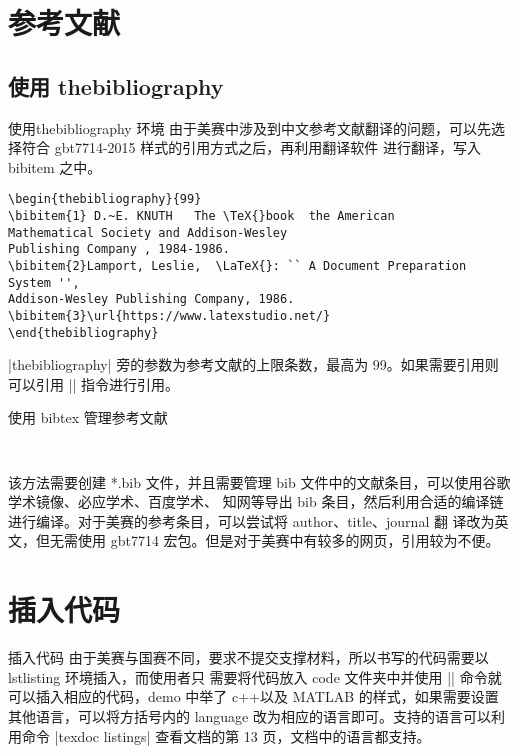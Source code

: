 \section{参考文献}
\subsection{使用 thebibliography }

\begin{frame}[fragile]{使用thebibliography 环境}
由于美赛中涉及到中文参考文献翻译的问题，可以先选择符合 gbt7714-2015 样式的引用方式之后，再利用翻译软件
进行翻译，写入 bibitem 之中。
\begin{lstlisting}[basicstyle=\tiny]
\begin{thebibliography}{99}
\bibitem{1} D.~E. KNUTH   The \TeX{}book  the American
Mathematical Society and Addison-Wesley
Publishing Company , 1984-1986.
\bibitem{2}Lamport, Leslie,  \LaTeX{}: `` A Document Preparation System '',
Addison-Wesley Publishing Company, 1986.
\bibitem{3}\url{https://www.latexstudio.net/}
\end{thebibliography}
\end{lstlisting}
|thebibliography| 旁的参数为参考文献的上限条数，最高为 99。如果需要引用则可以引用 |\cite{key}| 指令进行引用。
\end{frame}

\begin{frame}[fragile]{使用 bibtex 管理参考文献}
\begin{lstlisting}


\end{lstlisting}
该方法需要创建 *.bib 文件，并且需要管理 bib 文件中的文献条目，可以使用谷歌学术镜像、必应学术、百度学术、
知网等导出 bib 条目，然后利用合适的编译链进行编译。对于美赛的参考条目，可以尝试将 author、title、journal 翻
译改为英文，但无需使用 gbt7714 宏包。但是对于美赛中有较多的网页，引用较为不便。
\end{frame}

\section{插入代码}
\begin{frame}[fragile]{插入代码}
\phantom{幻影}由于美赛与国赛不同，要求不提交支撑材料，所以书写的代码需要以 lstlisting 环境插入，而使用者只
需要将代码放入 code 文件夹中并使用 ||	
命令就可以插入相应的代码，demo 中举了 c++以及 
MATLAB 
的样式，如果需要设置其他语言，可以将方括号内的 language 改为相应的语言即可。支持的语言可以利用命令 
|texdoc listings| 查看文档的第 13 页，文档中的语言都支持。
\end{frame}

